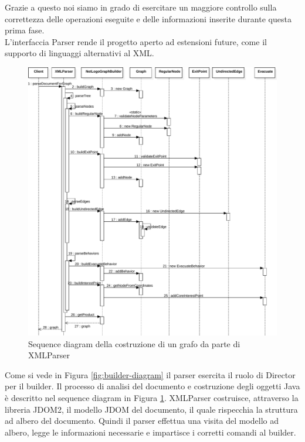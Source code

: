 Grazie a questo noi siamo in grado di esercitare un maggiore controllo sulla correttezza delle operazioni eseguite e delle informazioni inserite durante questa prima fase.\\
L'interfaccia Parser rende il progetto aperto ad estensioni future, come il supporto di linguaggi alternativi al XML.\\
\begin{figure}[htbp]
\centering
\includegraphics[width=\textwidth,height=\textheight,keepaspectratio]{images/builder-sequence.pdf}
\caption{Sequence diagram della costruzione di un grafo da parte di XMLParser}
\label{fig:builder-sequence}
\end{figure}
Come si vede in Figura \ref{fig:builder-diagram} il parser esercita il ruolo di Director per il builder. Il processo di analisi del documento e costruzione degli oggetti Java è descritto nel sequence diagram in Figura \ref{fig:builder-sequence}.
XMLParser costruisce, attraverso la libreria JDOM2, il modello JDOM del documento, il quale rispecchia la struttura ad albero del documento. Quindi il parser effettua una visita del modello ad albero, legge le informazioni necessarie e impartisce i corretti comandi al builder.\\

